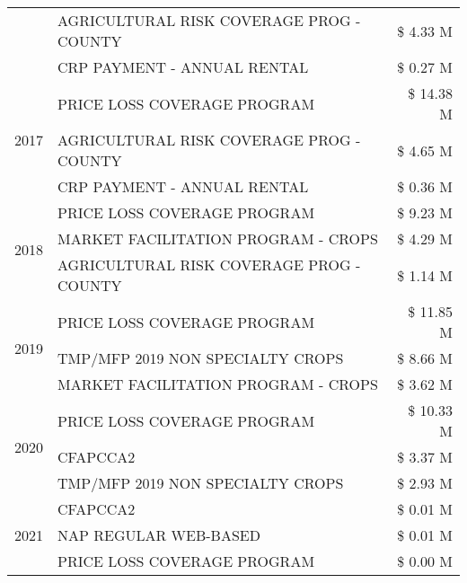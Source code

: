 \begin{tabular}{llr}
 & AGRICULTURAL RISK COVERAGE PROG - COUNTY      & \$ 4.33 M \\
 & CRP PAYMENT - ANNUAL RENTAL                   & \$ 0.27 M \\
\cline{1-3}
\multirow[t]{3}{*}{2017} & PRICE LOSS COVERAGE PROGRAM & \$ 14.38 M \\
 & AGRICULTURAL RISK COVERAGE PROG - COUNTY & \$ 4.65 M \\
 & CRP PAYMENT - ANNUAL RENTAL & \$ 0.36 M \\
\cline{1-3}
\multirow[t]{3}{*}{2018} & PRICE LOSS COVERAGE PROGRAM & \$ 9.23 M \\
 & MARKET FACILITATION PROGRAM - CROPS & \$ 4.29 M \\
 & AGRICULTURAL RISK COVERAGE PROG - COUNTY & \$ 1.14 M \\
\cline{1-3}
\multirow[t]{3}{*}{2019} & PRICE LOSS COVERAGE PROGRAM & \$ 11.85 M \\
 & TMP/MFP 2019 NON SPECIALTY CROPS & \$ 8.66 M \\
 & MARKET FACILITATION PROGRAM - CROPS & \$ 3.62 M \\
\cline{1-3}
\multirow[t]{3}{*}{2020} & PRICE LOSS COVERAGE PROGRAM & \$ 10.33 M \\
 & CFAPCCA2 & \$ 3.37 M \\
 & TMP/MFP 2019 NON SPECIALTY CROPS & \$ 2.93 M \\
\cline{1-3}
\multirow[t]{3}{*}{2021} & CFAPCCA2 & \$ 0.01 M \\
 & NAP REGULAR WEB-BASED & \$ 0.01 M \\
 & PRICE LOSS COVERAGE PROGRAM & \$ 0.00 M \\
\cline{1-3}
\bottomrule
\end{tabular}
